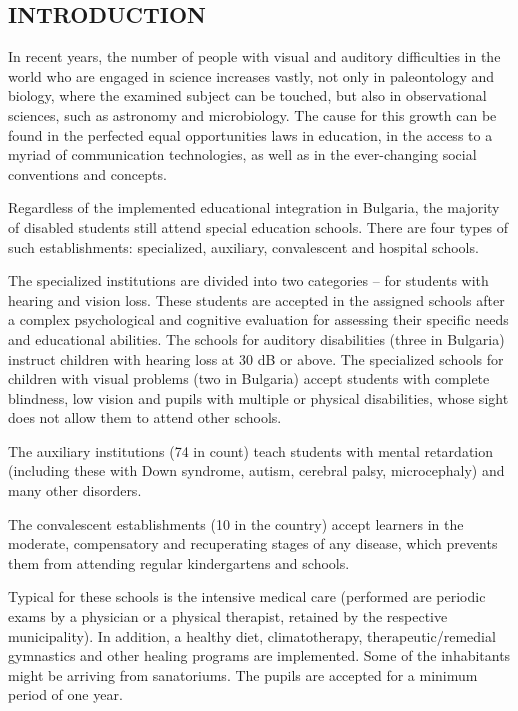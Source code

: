 \documentclass[11.5pt]{sig-alternate} %
\begin{document}
\begin{large}
\section*{INTRODUCTION}

In recent years, the number of people with visual and auditory difficulties in the world who are engaged in science increases vastly, not only in paleontology and biology, where the examined subject can be touched, but also in observational sciences, such as astronomy and microbiology. The cause for this growth can be found in the perfected equal opportunities laws in education, in the access to a myriad of communication technologies, as well as in the ever-changing social conventions and concepts.

Regardless of the implemented educational integration in Bulgaria, the majority of disabled students still attend special education schools. There are four types of such establishments: specialized, auxiliary, convalescent and hospital schools.

The specialized institutions are divided into two categories – for students with hearing and vision loss. These students are accepted in the assigned schools after a complex psychological and cognitive evaluation for assessing their specific needs and educational abilities. The schools for auditory disabilities (three in Bulgaria) instruct children with hearing loss at 30 dB or above. The specialized schools for children with visual problems (two in Bulgaria) accept students with complete blindness, low vision and pupils with multiple or physical disabilities, whose sight does not allow them to attend other schools.

The auxiliary institutions (74 in count) teach students with mental retardation (including these with Down syndrome, autism, cerebral palsy, microcephaly) and many other disorders.

The convalescent establishments (10 in the country) accept learners in the moderate, compensatory and recuperating stages of any disease, which prevents them from attending regular kindergartens and schools.

Typical for these schools is the intensive medical care (performed are periodic exams by a physician or a physical therapist, retained by the respective municipality). In addition, a healthy diet, climatotherapy, therapeutic/remedial gymnastics and other healing programs are implemented. Some of the inhabitants might be arriving from sanatoriums. The pupils are accepted for a minimum period of one year.


\end{large}
\end{document}
